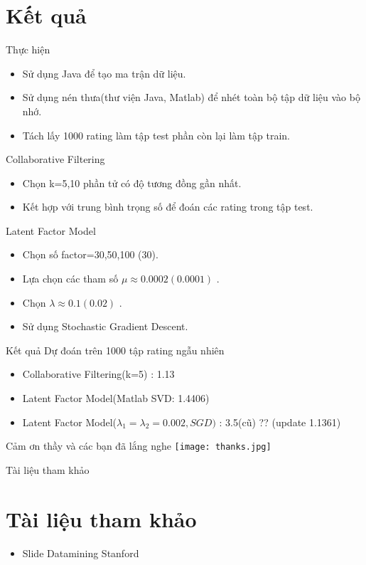 \documentclass{beamer}
\begin{document}
\section{Kết quả}
\begin{frame}{Thực hiện}
\begin{itemize}
\item Sử dụng Java để tạo ma trận dữ liệu.
\item Sử dụng nén thưa(thư viện Java, Matlab) để nhét toàn bộ tập dữ liệu vào bộ nhớ.
\item Tách lấy 1000 rating làm tập test phần còn lại làm tập train.
\end{itemize}
\end{frame}
\begin{frame}{Collaborative Filtering}
\begin{itemize}

\item Chọn k=5,10 phần tử có độ tương đồng gần nhất.
\item Kết hợp với trung bình trọng số để đoán các rating trong tập test.

\end{itemize}
\end{frame}
\begin{frame}{Latent Factor Model}
\begin{itemize}
\item Chọn số factor=30,50,100 (30).
\item Lựa chọn các tham số $\mu \approx 0.0002 (0.0001)$ .
\item Chọn $\lambda \approx 0.1 (0.02)$ .
\item Sử dụng Stochastic Gradient Descent.
\end{itemize}

\end{frame}
\begin{frame}{Kết quả}
Dự đoán trên 1000 tập rating ngẫu nhiên
\begin{itemize}
\item Collaborative Filtering(k=5) : 1.13
\item Latent Factor Model(Matlab SVD: 1.4406)
\item Latent Factor Model($\lambda_1=\lambda_2=0.002, SGD)$ : 3.5(cũ) ?? (update 1.1361)
\end{itemize}

\end{frame}
\begin{frame}{Cảm ơn thầy và các bạn đã lắng nghe}
\texttt{[image: thanks.jpg]}
\end{frame}
\begin{frame}{Tài liệu tham khảo}
\section*{Tài liệu tham khảo}
\begin{itemize}
\item Slide Datamining Stanford
\end{itemize}
\end{frame}
\end{document}
